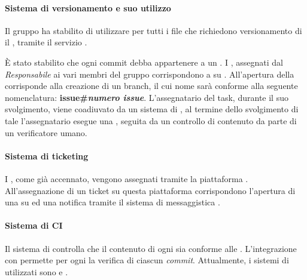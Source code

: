 \paragraph*{Sistema di versionamento e suo utilizzo} Il gruppo ha stabilito di utilizzare per tutti i file che richiedono versionamento di il  , tramite il servizio .

È stato stabilito che ogni commit debba appartenere a un . I , assegnati dal \textit{Responsabile} ai vari membri del gruppo corrispondono a  su . All'apertura della  corrisponde alla creazione di un branch, il cui nome sarà conforme alla seguente nomenclatura: \textbf{issue\#\textit{numero issue}}. L'assegnatario del task, durante il suo svolgimento, viene coadiuvato da un sistema di , al termine dello svolgimento di tale  l'assegnatario esegue una , seguita da un controllo di contenuto da parte di un verificatore umano.

\paragraph*{Sistema di ticketing} I , come già accennato, vengono assegnati tramite la piattaforma . All'assegnazione di un ticket su questa piattaforma corrispondono l'apertura di una  su  ed una notifica tramite il sistema di messaggistica .

\paragraph*{Sistema di CI}Il sistema di  controlla che il contenuto di ogni  sia conforme alle \NormeDiProgetto. L'integrazione con  permette per ogni  la verifica di ciascun \textit{commit}. Attualmente, i sistemi di  utilizzati sono  e .

